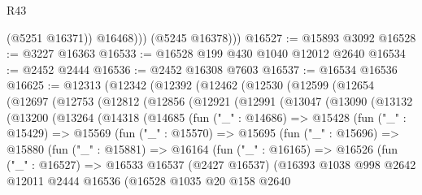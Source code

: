 \begin{lexlean}{R43}
\begin{coremodule}
                (@5251 @16371))
              @16468)))
        (@5245 @16378)))
@16527 := @15893 @3092
@16528 := @3227 @16363
@16533 := @16528 @199 @430 @1040 @12012 @2640
@16534 := @2452 @2444
@16536 := @2452 @16308 @7603
@16537 := @16534 @16536
@16625 := @12313
    (@12342
      (@12392
        (@12462
          (@12530
            (@12599
              (@12654
                (@12697
                  (@12753
                    (@12812
                      (@12856
                        (@12921
                          (@12991
                            (@13047
                              (@13090
                                (@13132
                                  (@13200
                                    (@13264
                                      (@14318
                                        (@14685
                                          (fun ("_" : @14686) =>
                                          @15428
                                            (fun ("_" : @15429) =>
                                            @15569
                                              (fun ("_" : @15570) =>
                                              @15695
                                                (fun ("_" : @15696) =>
                                                @15880
                                                  (fun ("_" : @15881) =>
                                                  @16164
                                                    (fun ("_" : @16165) =>
                                                    @16526
                                                      (fun ("_" : @16527) =>
                                                      @16533
                                                        @16537
                                                        (@2427 @16537)
                                                        (@16393
                                                          @1038
                                                          @998
                                                          @2642
                                                          @12011
                                                          @2444
                                                          @16536
                                                          (@16528
                                                            @1035
                                                            @20
                                                            @158
                                                            @2640

\end{coremodule}
\end{lexlean}

